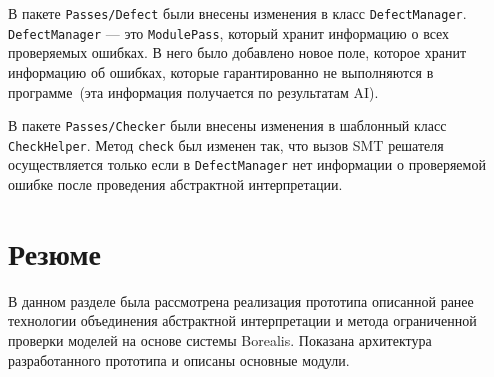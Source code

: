 В пакете \texttt{Passes/Defect} были внесены изменения в класс 
\texttt{DefectManager}. \texttt{DefectManager} --- это \texttt{ModulePass}, 
который хранит информацию о всех проверяемых ошибках. В него было добавлено
новое поле, которое хранит информацию об ошибках, которые гарантированно не 
выполняются в программе~(эта информация получается по результатам AI).

В пакете \texttt{Passes/Checker} были внесены изменения в шаблонный класс
\texttt{CheckHelper}. Метод \texttt{check} был изменен так, что вызов SMT 
решателя осуществляется только если в \texttt{DefectManager} нет информации
о проверяемой ошибке после проведения абстрактной интерпретации.

\section{Резюме}
В данном разделе была рассмотрена реализация прототипа описанной ранее 
технологии объединения абстрактной интерпретации и метода ограниченной проверки 
моделей на основе системы Borealis. Показана архитектура разработанного 
прототипа и описаны основные модули.